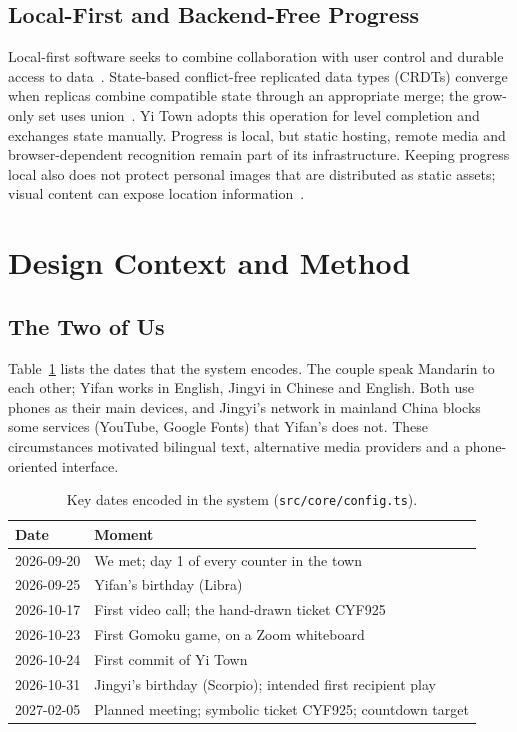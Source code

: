 \documentclass[sigconf,nonacm]{acmart}
\newcommand{\yt}{Yi Town}
\newcommand{\code}[1]{\textnormal{\texttt{\small #1}}}
\begin{document}
\subsection{Local-First and Backend-Free Progress}
Local-first software seeks to combine collaboration with user control and durable access to
data~\cite{kleppmann2019localfirst}. State-based conflict-free replicated data types (CRDTs)
converge when replicas combine compatible state through an appropriate merge; the grow-only set
uses union~\cite{shapiro2011crdt}. \yt{} adopts this operation for level completion and exchanges
state manually. Progress is local, but static hosting, remote media and browser-dependent
recognition remain part of its infrastructure.
Keeping progress local also does not protect personal images that are distributed as static
assets; visual content can expose location information~\cite{yang2024geolocator}.


\section{Design Context and Method}\label{sec:method}

\subsection{The Two of Us}
Table~\ref{tab:dates} lists the dates that the system encodes. The couple speak Mandarin to each
other; Yifan works in English, Jingyi in Chinese and English. Both use phones as their main
devices, and Jingyi's network in mainland China blocks some services (YouTube, Google Fonts) that
Yifan's does not. These circumstances motivated bilingual text, alternative media providers and a
phone-oriented interface.

\begin{table}[t]
  \caption{Key dates encoded in the system (\code{src/core/config.ts}).}
  \label{tab:dates}
  \small
  \begin{tabular}{@{}lp{}@{}}
    \toprule
    Date & Moment \\
    \midrule
    2026-09-20 & We met; day 1 of every counter in the town \\
    2026-09-25 & Yifan's birthday (Libra) \\
    2026-10-17 & First video call; the hand-drawn ticket CYF925 \\
    2026-10-23 & First Gomoku game, on a Zoom whiteboard \\
    2026-10-24 & First commit of \yt{} \\
    2026-10-31 & Jingyi's birthday (Scorpio); intended first recipient play \\
    2027-02-05 & Planned meeting; symbolic ticket CYF925; countdown target \\
    \bottomrule
  \end{tabular}
\end{table}
\end{document}
